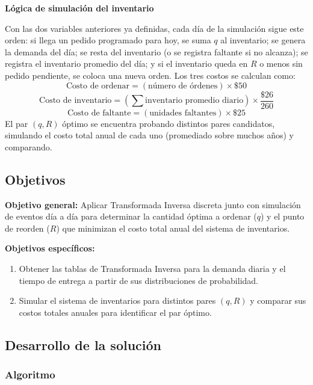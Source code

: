 \documentclass[12pt, a4paper]{article}
\begin{document}
\textbf{Lógica de simulación del inventario}

Con las dos variables anteriores ya definidas, cada día de la simulación sigue este orden: si llega un pedido programado para hoy, se suma $q$ al inventario; se genera la demanda del día; se resta del inventario (o se registra faltante si no alcanza); se registra el inventario promedio del día; y si el inventario queda en $R$ o menos sin pedido pendiente, se coloca una nueva orden. Los tres costos se calculan como:
\[
\text{Costo de ordenar} = (\text{n\'umero de \'ordenes}) \times \$50
\]
\[
\text{Costo de inventario} = \left(\sum \text{inventario promedio diario}\right) \times \frac{\$26}{260}
\]
\[
\text{Costo de faltante} = (\text{unidades faltantes}) \times \$25
\]
El par $(q,R)$ óptimo se encuentra probando distintos pares candidatos, simulando el costo total anual de cada uno (promediado sobre muchos años) y comparando.

\subsection{Objetivos}

\textbf{Objetivo general:} Aplicar Transformada Inversa discreta junto con simulación de eventos día a día para determinar la cantidad óptima a ordenar ($q$) y el punto de reorden ($R$) que minimizan el costo total anual del sistema de inventarios.

\textbf{Objetivos específicos:}
\begin{enumerate}
    \item Obtener las tablas de Transformada Inversa para la demanda diaria y el tiempo de entrega a partir de sus distribuciones de probabilidad.
    \item Simular el sistema de inventarios para distintos pares $(q, R)$ y comparar sus costos totales anuales para identificar el par óptimo.
\end{enumerate}

\subsection{Desarrollo de la solución}

\subsubsection{Algoritmo}
\end{document}
